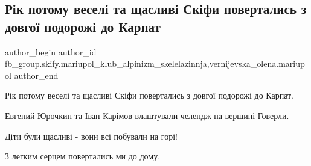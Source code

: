 
 
 
 
 
 
\subsection{Рік потому веселі та щасливі Скіфи повертались з довгої подорожі до Карпат}
\label{sec:24_02_2023.fb.fb_group.skify.mariupol_klub_alpinizm_skelelazinnja.1.karpaty_rik_tomu}
 
\ifcmt
 author_begin
   author_id fb_group.skify.mariupol_klub_alpinizm_skelelazinnja,vernijevska_olena.mariupol
 author_end
\fi

Рік потому веселі та щасливі Скіфи повертались з довгої подорожі до Карпат.

\href{https://www.facebook.com/profile.php?id=100024374770593}{Евгений Юрочкин} та Іван Карімов влаштували челендж на вершині Говерли. 

Діти були щасливі - вони всі побували на горі! 

З легким серцем повертались ми до дому.

